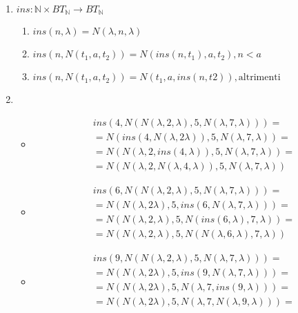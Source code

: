 \documentclass{article}
\begin{document}
\begin{enumerate}
    \item \(ins: \mathbb{N} \times BT_\mathbb{N} \rightarrow BT_\mathbb{N}\)
          \begin{enumerate}
              \item \(ins(n, \lambda) = N(\lambda, n, \lambda)\)
              \item \(ins(n, N(t_1, a, t_2)) = N(ins(n, t_1), a, t_2), n < a\)
              \item \(ins(n, N(t_1, a, t_2)) = N(t_1, a, ins(n, t2)), \text{altrimenti}\)
          \end{enumerate}

    \item
          \begin{itemize}
              \item
                    \begin{align*}
                         & ins(4, N(N(\lambda,2,\lambda), 5, N(\lambda,7,\lambda))) =            \\
                         & = N(ins(4, N(\lambda, 2 \lambda)), 5, N(\lambda, 7, \lambda)) =       \\
                         & = N(N(\lambda, 2, ins(4, \lambda)), 5, N(\lambda, 7, \lambda)) =      \\
                         & = N(N(\lambda, 2, N(\lambda, 4, \lambda)), 5, N(\lambda, 7, \lambda))
                    \end{align*}
              \item
                    \begin{align*}
                         & ins(6, N(N(\lambda,2,\lambda), 5, N(\lambda,7,\lambda))) =            \\
                         & = N(N(\lambda, 2 \lambda), 5, ins(6, N(\lambda, 7, \lambda))) =       \\
                         & = N(N(\lambda, 2, \lambda), 5, N(ins(6, \lambda), 7, \lambda)) =      \\
                         & = N(N(\lambda, 2, \lambda), 5, N(N(\lambda, 6, \lambda), 7, \lambda))
                    \end{align*}
              \item
                    \begin{align*}
                         & ins(9, N(N(\lambda,2,\lambda), 5, N(\lambda,7,\lambda))) =            \\
                         & = N(N(\lambda, 2 \lambda), 5, ins(9, N(\lambda, 7, \lambda))) =       \\
                         & = N(N(\lambda, 2 \lambda), 5, N(\lambda, 7, ins(9,\lambda))) =        \\
                         & = N(N(\lambda, 2 \lambda), 5, N(\lambda, 7, N(\lambda, 9,\lambda))) = \\
                    \end{align*}
          \end{itemize}
\end{enumerate}
\end{document}
